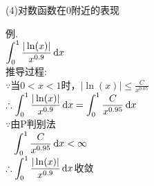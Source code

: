 (4)对数函数在$0$附近的表现
{\par\centering
{}
\par}
例.\\
$\displaystyle\int_0^1\frac{|\ln(x)|}{x^{0.9}}\mathop{}\!\mathrm{d} x$\\
推导过程:\\
$\because$当$0<x<1$时，$\displaystyle|\ln(x)|\leqslant\frac{C}{x^{0.05}}$\\
$\displaystyle\therefore\int_0^1\frac{|\ln(x)|}{x^{0.9}}\mathop{}\!\mathrm{d} x=\int_0^1\frac{C}{x^{0.95}}\mathop{}\!\mathrm{d} x$\\
$\because$由P判别法\\
$\displaystyle\phantom{\because}\int_0^1\frac{C}{x^{0.95}}\mathop{}\!\mathrm{d} x<\infty$\\
$\displaystyle\therefore\int_0^1\frac{|\ln(x)|}{x^{0.9}}\mathop{}\!\mathrm{d} x$收敛
